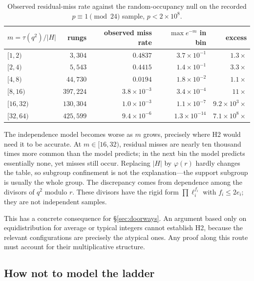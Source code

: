 \documentclass[11pt]{article}
\theoremstyle{definition}
\theoremstyle{remark}
\begin{document}
\begin{table}[ht]\centering
\caption{Observed residual-miss rate against the random-occupancy null on the recorded
$p\equiv1\pmod{24}$ sample, $p < 2\times10^8$.}
\label{tab:occ}
\small
\begin{tabular}{lrrrr}
\toprule
$m = \tau(q^2)/|H|$ & rungs & observed miss rate & $\max e^{-m}$ in bin & excess \\
\midrule
$[1,2)$   & $3{,}304$   & $0.4837$   & $3.7 \times 10^{-1}$  & $1.3\times$ \\
$[2,4)$   & $5{,}543$   & $0.4415$   & $1.4 \times 10^{-1}$  & $3.3\times$ \\
$[4,8)$   & $44{,}730$  & $0.0194$   & $1.8 \times 10^{-2}$  & $1.1\times$ \\
$[8,16)$  & $397{,}224$ & $3.8 \times 10^{-3}$ & $3.4 \times 10^{-4}$ & $11\times$ \\
$[16,32)$ & $130{,}304$ & $1.0 \times 10^{-3}$ & $1.1 \times 10^{-7}$ & $9.2 \times 10^{3}\times$ \\
$[32,64)$ & $425{,}599$ & $9.4 \times 10^{-6}$ & $1.3 \times 10^{-14}$ & $7.1 \times 10^{8}\times$ \\
\bottomrule
\end{tabular}
\end{table}

The independence model becomes worse as $m$ grows, precisely where H2 would need it to
be accurate. At $m\in[16,32)$, residual misses are nearly ten thousand times more
common than the model predicts; in the next bin the model predicts essentially none,
yet misses still occur. Replacing $|H|$ by $\varphi(r)$ hardly changes the table, so
subgroup confinement is not the explanation---the support subgroup is usually the
whole group. The discrepancy comes from dependence among the divisors of $q^2$ modulo
$r$. These divisors have the rigid form $\prod \ell_i^{f_i}$ with $f_i\le2e_i$; they
are not independent samples.

This has a concrete consequence for \S\ref{sec:doorways}. An argument based only on
equidistribution for average or typical integers cannot establish H2, because the
relevant configurations are precisely the atypical ones. Any proof along this route
must account for their multiplicative structure.

\subsection{How not to model the ladder}\label{sec:model}
\end{document}
